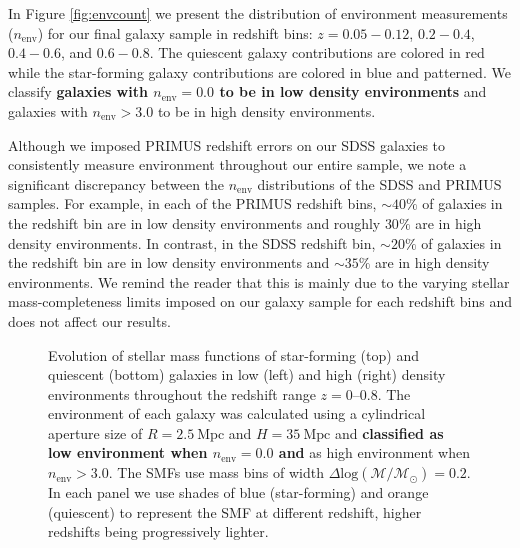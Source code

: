\documentclass{emulateapj}
\def \apradius{2.5}
\def \apheight{35}
\begin{document}
In Figure \ref{fig:envcount} we present the distribution of environment measurements ($n_{\mathrm{env}}$) for our final galaxy sample in redshift bins: $z = 0.05 - 0.12$, $0.2 - 0.4$, $0.4-0.6$, and $0.6-0.8$. The quiescent galaxy contributions are colored in red while the star-forming galaxy contributions are colored in blue and patterned. We classify {\bf galaxies with $n_{\mathrm{env}} = 0.0$ to be in low density environments} and galaxies with $n_{\mathrm{env}} > 3.0$ to be in high density environments. 

Although we imposed PRIMUS redshift errors on our SDSS galaxies to consistently measure environment throughout our entire sample, we note a significant discrepancy between the $n_{\mathrm{env}}$ distributions of the SDSS and PRIMUS samples. For example, in each of the PRIMUS redshift bins, $\sim 40 \%$ of galaxies in the redshift bin are in low density environments and roughly $30 \%$ are in high density environments. In contrast, in the SDSS redshift bin, $\sim 20 \%$ of galaxies in the redshift bin are in low density environments and $\sim 35 \%$ are in high density environments. We remind the reader that this is mainly due to the varying stellar mass-completeness limits imposed on our galaxy sample for each redshift bins and does not affect our results. 
\begin{figure}
  \begin{center}
    \leavevmode
     \caption{Evolution of stellar mass functions of star-forming (top) and quiescent (bottom) galaxies in 
low (left) and high (right) density environments throughout the redshift range
$z=0$--$0.8$. The environment of each galaxy  
was calculated using a cylindrical aperture size of $R=\apradius \: \mathrm{Mpc}$ and $H=\apheight \: \mathrm{Mpc}$ and  
{\bf classified as low environment when $n_{\mathrm{env}} = 0.0$ and }as high environment when $n_{\mathrm{env}} > 3.0$. The SMFs use mass bins of 
width $\Delta \mathrm{log}(\mathcal{M}/\mathcal{M}_{\odot})=0.2$. In each panel we use shades of blue 
(star-forming) and orange (quiescent) to represent the SMF at different redshift, higher redshifts being
progressively lighter.}      \label{fig:smf}
    \end{center}
\end{figure}
\end{document}

